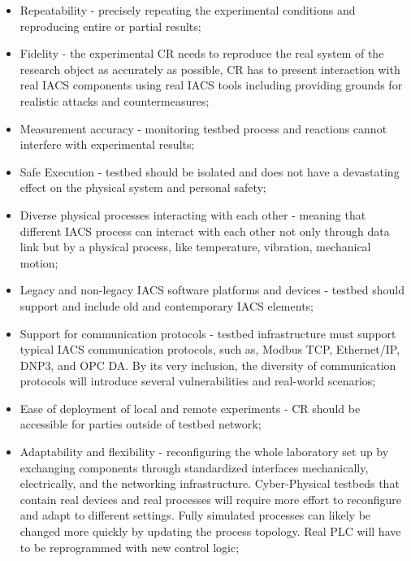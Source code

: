 \begin{itemize}
	
	\item Repeatability - precisely repeating the experimental conditions and reproducing entire or partial results;
	
	\item Fidelity - the experimental CR needs to reproduce the real system of the research object as accurately as possible, CR has to present interaction with real IACS components using real IACS tools including providing grounds for realistic attacks and countermeasures;
	
	\item Measurement accuracy - monitoring testbed process and reactions cannot interfere with experimental results;
	
	\item Safe Execution - testbed should be isolated and does not have a devastating effect on the physical system and personal safety;
	
	\item Diverse physical processes interacting with each other - meaning that different IACS process can interact with each other not only through data link but by a physical process, like temperature, vibration, mechanical motion;
	
	\item Legacy and non-legacy IACS software platforms and devices - testbed should support and include old and contemporary IACS elements;
	
	\item Support for communication protocols - testbed infrastructure must support typical IACS communication protocols, such as, Modbus TCP, Ethernet/IP, DNP3, and OPC DA. By its very inclusion, the diversity of communication protocols will introduce several vulnerabilities and real-world scenarios;
	
	\item Ease of deployment of local and remote experiments - CR should be accessible for parties outside of testbed network;
	
	\item Adaptability and flexibility - reconfiguring the whole laboratory set up by exchanging components through standardized interfaces mechanically, electrically, and the networking infrastructure. Cyber-Physical testbeds that contain real devices and real processes will require more effort to reconfigure and adapt to different settings. Fully simulated processes can likely be changed more quickly by updating the process topology. Real PLC will have to be reprogrammed with new control logic; 
	

\end{itemize}
